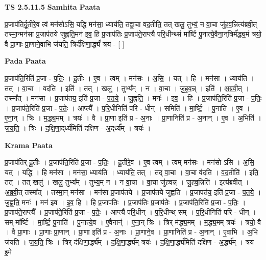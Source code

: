 \documentclass[17pt]{extarticle}
\begin{document}
\textbf{TS 2.5.11.5 } \newline
\textbf{Samhita Paata} \newline

प्र॒जाप॑तिर्दू॒तीरे॒व त्वं मन॑सोऽसि॒ यद्धि मन॑सा॒ ध्याय॑ति॒ तद्वा॒चा वद॒तीति॒ तत् खलु॒ तुभ्यं॒ न वा॒चा जु॑हव॒न्नित्य॑ब्रवी॒त् तस्मा॒न्मन॑सा प्र॒जाप॑तये जुह्वति॒मन॑ इव॒ हि प्र॒जाप॑तिः प्र॒जाप॑ते॒राप्त्यै॑ परि॒धीन्थ्सं मा᳚र्ष्टि पु॒नात्ये॒वैना॒न्‌त्रिर्म॑द्ध्य॒मं त्रयो॒ वै प्रा॒णाः प्रा॒णाने॒वाभि ज॑यति॒ त्रिर्द॑क्षिणा॒र्द्ध्यं॑ त्रय॑ - [  ] \newline

\textbf{Pada Paata} \newline

प्र॒जाप॑ति॒रिति॑ प्र॒जा - प॒तिः॒ । दू॒तीः । ए॒व । त्वम् । मन॑सः । अ॒सि॒ । यत् । हि । मन॑सा । ध्याय॑ति । तत् । वा॒चा । वद॑ति । इति॑ । तत् । खलु॑ । तुभ्य᳚म् । न । वा॒चा । जु॒ह॒व॒न्न् । इति॑ । अ॒ब्र॒वी॒त् । तस्मा᳚त् । मन॑सा । प्र॒जाप॑तय॒ इति॑ प्र॒जा - प॒त॒ये॒ । जु॒ह्व॒ति॒ । मनः॑ । इ॒व॒ । हि । प्र॒जाप॑ति॒रिति॑ प्र॒जा - प॒तिः॒ । प्र॒जाप॑ते॒रिति॑ प्र॒जा - प॒तेः॒ । आप्त्यै᳚ । प॒रि॒धीनिति॑ परि - धीन् । समिति॑ । मा॒र्ष्टि॒ । पु॒नाति॑ । ए॒व । ए॒ना॒न् । त्रिः । म॒द्ध्य॒मम् । त्रयः॑ । वै । प्रा॒णा इति॑ प्र - अ॒नाः । प्रा॒णानिति॑ प्र - अ॒नान् । ए॒व । अ॒भिति॑ । ज॒य॒ति॒ । त्रिः । द॒क्षि॒णा॒द्‌र्ध्य॑मिति॑ दक्षिण - अ॒द्‌र्ध्य᳚म् । त्रयः॑ ।  \newline


\textbf{Krama Paata} \newline

प्र॒जाप॑तिर् दू॒तीः । प्र॒जाप॑ति॒रिति॑ प्र॒जा - प॒तिः॒ । दू॒तीरे॒व । ए॒व त्वम् । त्वम् मन॑सः । मन॑सो ऽसि । अ॒सि॒ यत् । यद्धि । हि मन॑सा । मन॑सा॒ ध्याय॑ति । ध्याय॑ति॒ तत् । तद् वा॒चा । वा॒चा व॑दति । व॒द॒तीति॑ । इति॒ तत् । तत् खलु॑ । खलु॒ तुभ्य᳚म् । तुभ्य॒म् न । न वा॒चा । वा॒चा जु॑हवन्न् । जु॒ह॒व॒न्निति॑ । इत्य॑ब्रवीत् । अ॒ब्र॒वी॒त् तस्मा᳚त् । तस्मा॒न् मन॑सा । मन॑सा प्र॒जाप॑तये । प्र॒जाप॑तये जुह्वति । प्र॒जापत॑य॒ इति॑ प्र॒जा - प॒त॒ये॒ । जु॒ह्व॒ति॒ मनः॑ । मन॑ इव । इ॒व॒ हि । हि प्र॒जाप॑तिः । प्र॒जाप॑तिः प्र॒जाप॑तेः । प्र॒जाप॑ति॒रिति॑ प्र॒जा - प॒तिः॒ । प्र॒जाप॑ते॒राप्त्यै᳚ । प्र॒जाप॑ते॒रिति॑ प्र॒जा - प॒तेः॒ । आप्त्यै॑ परि॒धीन् । प॒रि॒धीन्थ् सम् । प॒रि॒धीनिति॑ परि - धीन् । सम् मा᳚र्ष्टि । मा॒र्ष्टि॒ पु॒नाति॑ । पु॒नात्ये॒व । ए॒वैनान्॑ । ए॒ना॒न् त्रिः । त्रिर् म॑द्ध्य॒मम् । म॒द्ध्य॒मम् त्रयः॑ । त्रयो॒ वै । वै प्रा॒णाः । प्रा॒णाः प्रा॒णान् । प्रा॒णा इति॑ प्र - अ॒नाः । प्रा॒णाने॒व । प्रा॒णानिति॑ प्र - अ॒नान् । ए॒वाभि । अ॒भि ज॑यति । ज॒य॒ति॒ त्रिः । त्रिर् द॑क्षिणा॒र्द्ध्य᳚म् । द॒क्षि॒णा॒र्द्ध्य॑म् त्रयः॑ । द॒क्षि॒णा॒र्द्ध्य॑मिति॑ दक्षिण - अ॒र्द्ध्य᳚म् । त्रय॑ इ॒मे \newline
\end{document}
